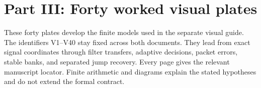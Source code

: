 \documentclass[11pt,letterpaper]{article}
\theoremstyle{plain}
\theoremstyle{plain}
\theoremstyle{plain}
\theoremstyle{definition}
\theoremstyle{definition}
\theoremstyle{definition}
\theoremstyle{definition}
\theoremstyle{remark}
\theoremstyle{remark}
\theoremstyle{remark}
\theoremstyle{remark}
\begin{document}
\clearpage
\part*{Part III: Forty worked visual plates}
\begin{readerroadmap}[title={A second route through the mathematics}]
These forty plates develop the finite models used in the separate visual guide. The identifiers V1--V40 stay fixed across both documents. They lead from exact signal coordinates through filter transfers, adaptive decisions, packet errors, stable banks, and separated jump recovery. Every page gives the relevant manuscript locator. Finite arithmetic and diagrams explain the stated hypotheses and do not extend the formal contract.
\end{readerroadmap}
\clearpage
\begingroup
\setlength{\parskip}{3pt}
\setlength{\abovedisplayskip}{6pt}\setlength{\belowdisplayskip}{6pt}
\fontsize{10}{12}\selectfont

\endgroup
\clearpage



\end{document}
